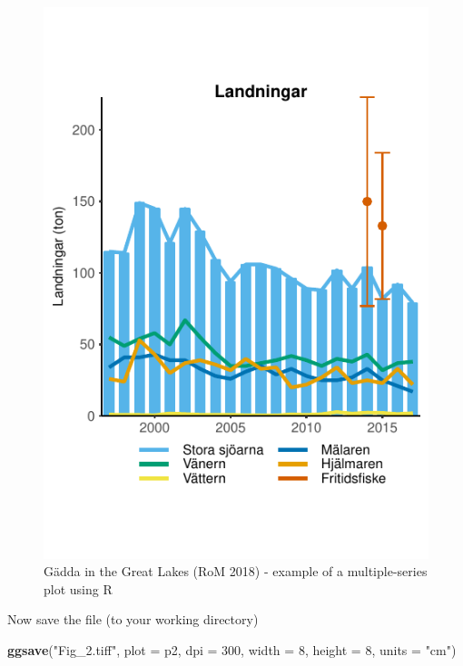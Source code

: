 \documentclass[]{article}
\newenvironment{Shaded}{\begin{snugshade}}{\end{snugshade}}
\newcommand{\KeywordTok}[1]{\textcolor[rgb]{0.13,0.29,0.53}{\textbf{#1}}}
\newcommand{\DataTypeTok}[1]{\textcolor[rgb]{0.13,0.29,0.53}{#1}}
\newcommand{\DecValTok}[1]{\textcolor[rgb]{0.00,0.00,0.81}{#1}}
\newcommand{\StringTok}[1]{\textcolor[rgb]{0.31,0.60,0.02}{#1}}
\newcommand{\NormalTok}[1]{#1}
\begin{document}
\begin{figure}

{\centering \includegraphics{Making_figures_for_RoM_in_R_files/figure-latex/unnamed-chunk-21-1} 

}

\caption{Gädda in the Great Lakes (RoM 2018) - example of a multiple-series plot using R}\label{fig:unnamed-chunk-21}
\end{figure}

Now save the file (to your working directory)

\begin{Shaded}
\begin{Highlighting}[]
\KeywordTok{ggsave}\NormalTok{(}\StringTok{"Fig_2.tiff"}\NormalTok{, }\DataTypeTok{plot =}\NormalTok{ p2, }\DataTypeTok{dpi =} \DecValTok{300}\NormalTok{, }\DataTypeTok{width =} \DecValTok{8}\NormalTok{, }\DataTypeTok{height =} \DecValTok{8}\NormalTok{, }\DataTypeTok{units =} \StringTok{"cm"}\NormalTok{)}
\end{Highlighting}
\end{Shaded}
\end{document}
